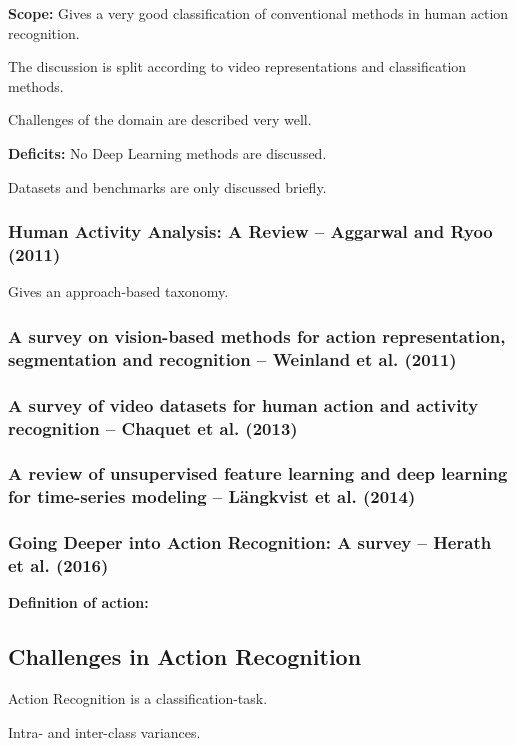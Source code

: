 \textbf{Scope:} Gives a very good classification of conventional methods in human action recognition.

The discussion is split according to video representations and classification methods.

Challenges of the domain are described very well.

\textbf{Deficits:} No Deep Learning methods are discussed. 

Datasets and benchmarks are only discussed briefly.

\subsubsection{Human Activity Analysis: A Review -- Aggarwal and Ryoo (2011)}

Gives an approach-based taxonomy.

\subsubsection{A survey on vision-based methods for action representation, segmentation and recognition -- Weinland et al. (2011)}

\subsubsection{A survey of video datasets for human action and activity recognition -- Chaquet et al. (2013)}

\subsubsection{A review of unsupervised feature learning and deep learning for time-series modeling -- Längkvist et al. (2014)}

\subsubsection{Going Deeper into Action Recognition: A survey -- Herath et al. (2016)}

\textbf{Definition of action:} 

\subsection{Challenges in Action Recognition}
Action Recognition is a classification-task.

Intra- and inter-class variances.

